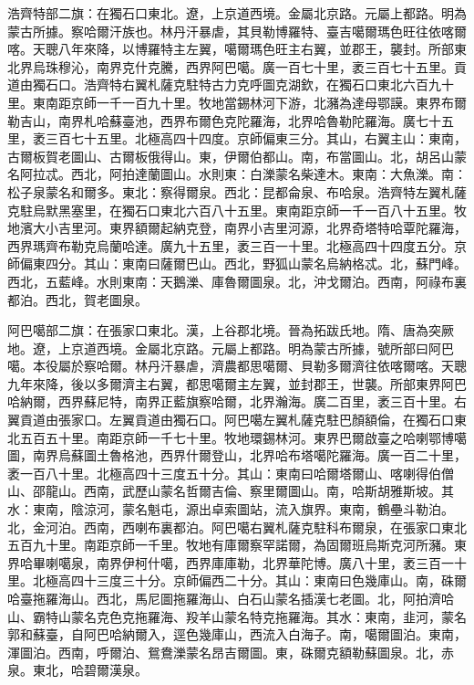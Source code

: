 \begin{pinyinscope}
浩齊特部二旗：在獨石口東北。遼，上京道西境。金屬北京路。元屬上都路。明為蒙古所據。察哈爾汗族也。林丹汗暴虐，其貝勒博羅特、臺吉噶爾瑪色旺往依喀爾喀。天聰八年來降，以博羅特主左翼，噶爾瑪色旺主右翼，並郡王，襲封。所部東北界烏珠穆沁，南界克什克騰，西界阿巴噶。廣一百七十里，袤三百七十五里。貢道由獨石口。浩齊特右翼札薩克駐特古力克呼圖克湖欽，在獨石口東北六百九十里。東南距京師一千一百九十里。牧地當錫林河下游，北瀦為達母鄂謨。東界布爾勒吉山，南界札哈蘇臺池，西界布爾色克陀羅海，北界哈魯勒陀羅海。廣七十五里，袤三百七十五里。北極高四十四度。京師偏東三分。其山，右翼主山：東南，古爾板賀老圖山、古爾板俄得山。東，伊爾伯都山。南，布當圖山。北，胡呂山蒙名阿拉忒。西北，阿拍達蘭圖山。水則東：白濼蒙名柴達木。東南：大魚濼。南：松子泉蒙名和爾多。東北：察得爾泉。西北：昆都侖泉、布哈泉。浩齊特左翼札薩克駐烏默黑塞里，在獨石口東北六百八十五里。東南距京師一千一百八十五里。牧地濱大小吉里河。東界額爾起納克登，南界小吉里河源，北界奇塔特哈覃陀羅海，西界瑪齊布勒克烏蘭哈達。廣九十五里，袤三百一十里。北極高四十四度五分。京師偏東四分。其山：東南曰薩爾巴山。西北，野狐山蒙名烏納格忒。北，蘇門峰。西北，五藍峰。水則東南：天鵝濼、庫魯爾圖泉。北，沖戈爾泊。西南，阿祿布裏都泊。西北，賀老圖泉。

阿巴噶部二旗：在張家口東北。漢，上谷郡北境。晉為拓跋氏地。隋、唐為突厥地。遼，上京道西境。金屬北京路。元屬上都路。明為蒙古所據，號所部曰阿巴噶。本役屬於察哈爾。林丹汗暴虐，濟農都思噶爾、貝勒多爾濟往依喀爾喀。天聰九年來降，後以多爾濟主右翼，都思噶爾主左翼，並封郡王，世襲。所部東界阿巴哈納爾，西界蘇尼特，南界正藍旗察哈爾，北界瀚海。廣二百里，袤三百十里。右翼貢道由張家口。左翼貢道由獨石口。阿巴噶左翼札薩克駐巴顏額倫，在獨石口東北五百五十里。南距京師一千七十里。牧地環錫林河。東界巴爾啟臺之哈喇鄂博噶圖，南界烏蘇圖土魯格池，西界什爾登山，北界哈布塔噶陀羅海。廣一百二十里，袤一百八十里。北極高四十三度五十分。其山：東南曰哈爾塔爾山、喀喇得伯僧山、邵龍山。西南，武歷山蒙名哲爾吉倫、察里爾圖山。南，哈斯胡雅斯坡。其水：東南，陰涼河，蒙名魁屯，源出卓索圖站，流入旗界。東南，鶴壘斗勒泊。北，金河泊。西南，西喇布裏都泊。阿巴噶右翼札薩克駐科布爾泉，在張家口東北五百九十里。南距京師一千里。牧地有庫爾察罕諾爾，為固爾班烏斯克河所瀦。東界哈畢喇噶泉，南界伊柯什噶，西界庫庫勒，北界華陀博。廣八十里，袤三百一十里。北極高四十三度三十分。京師偏西二十分。其山：東南曰色幾庫山。南，硃爾哈臺拖羅海山。西北，馬尼圖拖羅海山、白石山蒙名插漢七老圖。北，阿拍濟哈山、霸特山蒙名克色克拖羅海、羖羊山蒙名特克拖羅海。其水：東南，韭河，蒙名郭和蘇臺，自阿巴哈納爾入，逕色幾庫山，西流入白海子。南，噶爾圖泊。東南，渾圖泊。西南，呼爾泊、鴛鴦濼蒙名昂吉爾圖。東，硃爾克額勒蘇圖泉。北，赤泉。東北，哈碧爾漢泉。


\end{pinyinscope}
